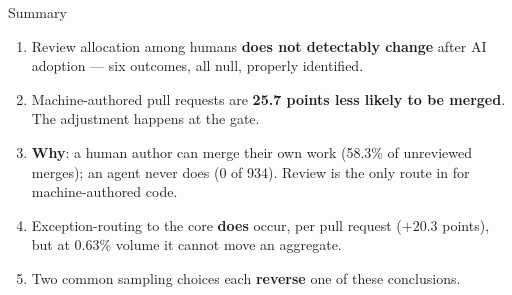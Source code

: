 \begin{frame}{Summary}
\begin{enumerate}
  \item Review allocation among humans \textbf{does not detectably change}
        after AI adoption --- six outcomes, all null, properly identified.
  \item Machine-authored pull requests are \textbf{25.7 points less likely to
        be merged}. The adjustment happens at the gate.
  \item \textbf{Why}: a human author can merge their own work (58.3\% of
        unreviewed merges); an agent never does (0 of 934). Review is the only
        route in for machine-authored code.
  \item Exception-routing to the core \textbf{does} occur, per pull request
        ($+20.3$ points), but at 0.63\% volume it cannot move an aggregate.
  \item Two common sampling choices each \textbf{reverse} one of these
        conclusions.
\end{enumerate}
\end{frame}
